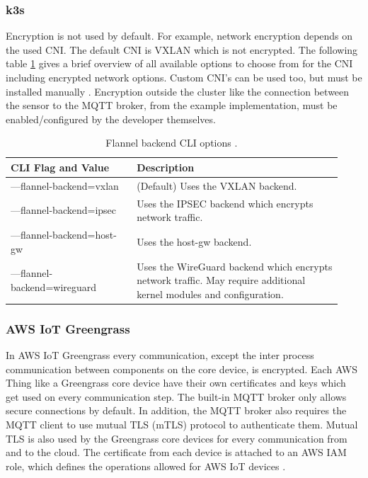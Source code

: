 \subsubsection*{k3s}
Encryption is not used by default. For example, network encryption depends on the used \gls{CNI}. The default \gls{CNI} is VXLAN which is not encrypted. The following table \ref{tap:k3s-flannel-options} gives a brief overview of all available options to choose from for the \gls{CNI} including encrypted network options. Custom \gls{CNI}'s can be used too, but must be installed manually \cite{k3sNetworkOptions}. Encryption outside the cluster like the connection between the sensor to the MQTT broker, from the example implementation, must be enabled/configured by the developer themselves.

\begin{table}[H]
\centering
\begin{tabular}{|p{0.35\linewidth}|p{0.58\linewidth}|} \hline
    \textbf{CLI Flag and Value} & \textbf{Description} \\ \hline
    ---flannel-backend=vxlan     & (Default) Uses the VXLAN backend. \\ \hline
    ---flannel-backend=ipsec     & Uses the IPSEC backend which encrypts network traffic. \\ \hline
    ---flannel-backend=host-gw   & Uses the host-gw backend. \\ \hline
    ---flannel-backend=wireguard & Uses the WireGuard backend which encrypts network traffic. May require additional kernel modules and configuration. \\ \hline
\end{tabular}
\caption{Flannel backend CLI options \cite{k3sNetworkOptions}.}\label{tap:k3s-flannel-options}
\end{table}

\subsubsection*{AWS IoT Greengrass}
In AWS IoT Greengrass every communication, except the inter process communication between components on the core device, is encrypted. Each AWS Thing like a Greengrass core device have their own certificates and keys which get used on every communication step. The built-in MQTT broker only allows secure connections by default. In addition, the MQTT broker also requires the MQTT client to use mutual TLS (mTLS) protocol to authenticate them. Mutual TLS is also used by the Greengrass core devices for every communication from and to the cloud. The certificate from each device is attached to an AWS IAM role, which defines the operations allowed for AWS IoT devices \cite{AWSGGCEncryptionInTransit} \cite{AWSGGCDeviceAuth}.

